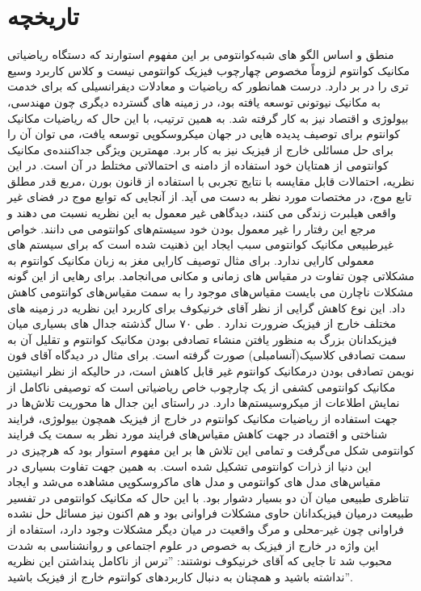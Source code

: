 \documentclass[a4paper,titlepage,12pt,fleqn,oneside]{report}
\begin{document}
	\section{تاریخچه}
	
	منطق و اساس الگو های شبه‌کوانتومی بر این مفهوم استوارند که دستگاه ریاضیاتی مکانیک کوانتوم لزوماً مخصوص چهارچوب فیزیک کوانتومی نیست و کلاس کاربرد وسیع تری را در بر دارد.  درست همانطور که ریاضیات و معادلات دیفرانسیلی که برای خدمت به مکانیک نیوتونی توسعه یافته بود،  در زمینه های گسترده دیگری چون مهندسی،  بیولوژی و اقتصاد  نیز به کار گرفته شد.  به همین ترتیب، با این حال که ریاضیات مکانیک کوانتوم برای توصیف پدیده هایی در جهان میکروسکوپی  توسعه یافت،  می توان آن را برای حل مسائلی خارج از فیزیک نیز به کار برد.  مهمترین ویژگی جداکننده‌ی مکانیک کوانتومی از همتایان خود استفاده از دامنه ی احتمالاتی مختلط در آن است. در این نظریه، احتمالات قابل مقایسه با نتایج تجربی با استفاده از قانون بورن ،مربع قدر مطلق تابع موج، در مختصات مورد نظر به دست می آید.  از آنجایی که توابع موج در فضای غیر واقعی 
	هیلبرت   زندگی می کنند،  دیدگاهی غیر معمول به این نظریه نسبت می دهند و مرجع  این رفتار را غیر معمول بودن خود  سیستم‌های  کوانتومی می دانند. خواص غیرطبیعی مکانیک کوانتومی سبب ایجاد این ذهنیت شده است که برای سیستم های معمولی کارایی ندارد.  برای مثال توصیف کارایی مغز به زبان مکانیک کوانتوم به مشکلاتی چون تفاوت در مقیاس های زمانی و مکانی  می‌انجامد.  برای رهایی از این گونه مشکلات ناچارن می بایست مقیاس‌های موجود را به سمت مقیاس‌های کوانتومی کاهش داد.  این نوع کاهش گرایی از نظر آقای خرنیکوف برای کاربرد این نظریه در زمینه های مختلف  خارج از فیزیک ضرورت ندارد \cite{kh4}
	. طی ۷۰ سال گذشته جدال های بسیاری میان فیزیکدانان بزرگ به منظور یافتن منشاء 
	تصادفی بودن مکانیک کوانتوم  و تقلیل آن به سمت تصادفی کلاسیک(آنسامبلی) صورت گرفته است.  برای مثال در دیدگاه آقای فون نویمن تصادفی بودن درمکانیک کوانتوم غیر قابل کاهش است، در حالیکه از نظر انیشتین مکانیک کوانتومی کشفی از  یک چارچوب خاص ریاضیاتی است که  توصیفی ناکامل از نمایش اطلاعات از میکروسیستم‌ها دارد.  در راستای این جدال ها محوریت تلاش‌ها در جهت استفاده از ریاضیات مکانیک کوانتوم در خارج از فیزیک همچون بیولوژی، فرایند شناختی و اقتصاد در جهت کاهش مقیاس‌های فرایند مورد نظر به سمت یک فرایند کوانتومی شکل می‌گرفت و تمامی این تلاش ها بر این مفهوم استوار بود که هرچیزی در این دنیا از ذرات کوانتومی تشکیل شده است. به همین جهت تفاوت بسیاری در مقیاس‌های مدل های کوانتومی و مدل های ماکروسکوپی مشاهده می‌شد و ایجاد  تناظری طبیعی میان آن دو بسیار دشوار بود.  با این حال که مکانیک کوانتومی در تفسیر طبیعت درمیان فیزیکدانان حاوی مشکلات فراوانی بود و هم اکنون نیز مسائل حل نشده فراوانی چون غیر-محلی و مرگ واقعیت در میان دیگر مشکلات وجود دارد،  استفاده از این واژه در خارج از فیزیک به خصوص در علوم اجتماعی و روانشناسی به شدت محبوب شد تا جایی که آقای خرنیکوف نوشتند:  ''ترس از ناکامل پنداشتن این نظریه نداشته باشید و همچنان به دنبال کاربردهای کوانتوم خارج از فیزیک باشید''. 
	
\end{document}
